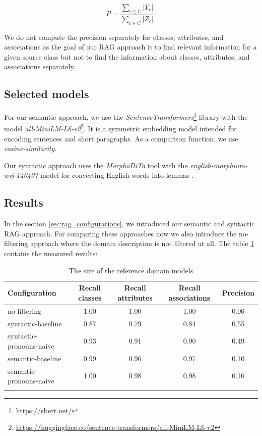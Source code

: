 \[ P = \dfrac{\sum_{c \in C}|Y_c|}{\sum_{c \in C}|Z_c|}. \]

We do not compute the precision separately for classes, attributes, and associations as the goal of our RAG approach is to find relevant information for a given source class but not to find the information about classes, attributes, and associations separately.


\subsection{Selected models}

For our semantic approach, we use the \textit{SentenceTransformers}\footnote{\url{https://sbert.net/}} library with the model \textit{all-MiniLM-L6-v2}\footnote{\url{https://huggingface.co/sentence-transformers/all-MiniLM-L6-v2}}. It is a symmetric embedding model intended for encoding sentences and short paragraphs. As a comparison function, we use \textit{cosine-similarity}.

Our syntactic approach uses the \textit{MorphoDiTa} tool \cite{Strakova2014} with the \textit{english-morphium-wsj-140407} model for converting English words into lemmas \cite{Straka2014}.


\subsection{Results}

In the section \ref{sec:rag_configurations}, we introduced our semantic and syntactic RAG approach. For comparing these approaches now we also introduce the no-filtering approach where the domain description is not filtered at all. The table \ref{tab:filtering-results} contains the measured results:

\begin{table}[!h]
    \scriptsize
    \centering
    \setlength{\tabcolsep}{0.5em}
    \begin{tabular}{lcccc}

    \toprule
       Configuration & Recall classes & Recall attributes & Recall associations & Precision \\
    \toprule
    
    \addlinespace
         no-filtering      & 1.00  & 1.00  & 1.00 & 0.06 \\
    	 syntactic-baseline & 0.87 & 0.79 & 0.84 & 0.55 \\
         syntactic-pronouns-naive & 0.93  & 0.91  & 0.90 & 0.49 \\
         semantic-baseline & 0.99 & 0.96 & 0.97 & 0.10 \\
         semantic-pronouns-naive & 1.00 & 0.98 & 0.98 & 0.10 \\
    \addlinespace
    \bottomrule
    \addlinespace
    \end{tabular}
    \caption{The size of the reference domain models}
    \label{tab:filtering-results}
\end{table}

